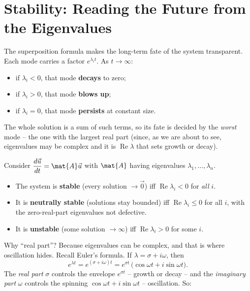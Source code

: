 \section{Stability: Reading the Future from the Eigenvalues}
\label{ch25:stability}

The superposition formula makes the long-term fate of the system transparent.
Each mode carries a factor $e^{\lambda_i t}$. As $t\to\infty$:
\begin{itemize}
  \item if $\lambda_i < 0$, that mode \textbf{decays} to zero;
  \item if $\lambda_i > 0$, that mode \textbf{blows up};
  \item if $\lambda_i = 0$, that mode \textbf{persists} at constant size.
\end{itemize}
The whole solution is a sum of such terms, so its fate is decided by the
\emph{worst} mode -- the one with the largest real part (since, as we are about
to see, eigenvalues may be complex and it is $\operatorname{Re}\lambda$ that sets
growth or decay).

\begin{formalbox}
Consider $\dfrac{d\vec{u}}{dt}=\mat{A}\vec{u}$ with $\mat{A}$ having eigenvalues
$\lambda_1,\dots,\lambda_n$.
\begin{itemize}
  \item The system is \textbf{stable} (every solution $\to\vec{0}$) iff
        $\operatorname{Re}\lambda_i < 0$ for \emph{all} $i$.
  \item It is \textbf{neutrally stable} (solutions stay bounded) iff
        $\operatorname{Re}\lambda_i \le 0$ for all $i$, with the
        zero-real-part eigenvalues not defective.
  \item It is \textbf{unstable} (some solution $\to\infty$) iff
        $\operatorname{Re}\lambda_i > 0$ for some $i$.
\end{itemize}
\end{formalbox}

Why ``real part''? Because eigenvalues can be complex, and that is where
oscillation hides. Recall Euler's formula. If $\lambda = \sigma + i\omega$, then
\[
  e^{\lambda t} = e^{(\sigma + i\omega)t}
  = e^{\sigma t}\,\bigl(\cos\omega t + i\sin\omega t\bigr).
\]
The \emph{real part} $\sigma$ controls the envelope $e^{\sigma t}$ -- growth or
decay -- and the \emph{imaginary part} $\omega$ controls the spinning
$\cos\omega t + i\sin\omega t$ -- oscillation. So:


